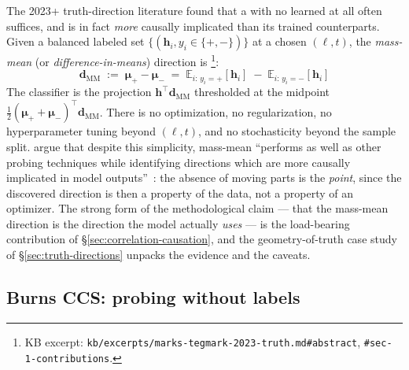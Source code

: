 The 2023+ truth-direction literature found that a  with no learned
 at all often suffices, and is in fact \emph{more} causally
implicated than its trained counterparts. Given a balanced labeled set
$\{(\mathbf{h}_i, y_i \in \{+, -\})\}$ at a chosen $(\ell, t)$, the
\emph{mass-mean} (or \emph{difference-in-means})  direction is
\citep{marks-tegmark-2023-truth}\footnote{KB excerpt:
\texttt{kb/excerpts/marks-tegmark-2023-truth.md\#abstract},
\texttt{\#sec-1-contributions}.}:
\begin{equation}
  \boxed{\;
  \mathbf{d}_{\mathrm{MM}}
  \;:=\; \boldsymbol{\mu}_+ - \boldsymbol{\mu}_-
  \;=\; \mathbb{E}_{i:\,y_i = +}[\mathbf{h}_i] \;-\; \mathbb{E}_{i:\,y_i = -}[\mathbf{h}_i]
  \;}
  \label{eq:mass-mean}
\end{equation}
The classifier is the projection $\mathbf{h}^\top \mathbf{d}_{\mathrm{MM}}$
thresholded at the midpoint
$\tfrac{1}{2}(\boldsymbol{\mu}_+ + \boldsymbol{\mu}_-)^\top
\mathbf{d}_{\mathrm{MM}}$. There is no optimization, no regularization,
no hyperparameter tuning beyond $(\ell, t)$, and no stochasticity beyond
the sample split. \citet{marks-tegmark-2023-truth} argue that despite
this simplicity, mass-mean ``performs as well as other probing techniques
while identifying directions which are more causally implicated in model
outputs''~\citep[abstract]{marks-tegmark-2023-truth}: the absence of
moving parts is the \emph{point}, since the discovered direction is then
a property of the data, not a property of an optimizer. The strong
form of the methodological claim — that the mass-mean direction is the
direction the model actually \emph{uses} — is the load-bearing
contribution of \S\ref{sec:correlation-causation}, and the geometry-of-truth
case study of \S\ref{sec:truth-directions} unpacks the evidence and the
caveats.

\subsection{Burns CCS: probing without labels}
\label{sec:ccs}

